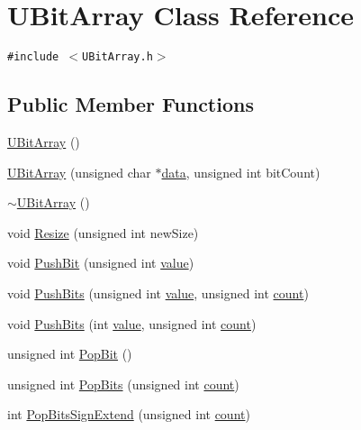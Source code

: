\hypertarget{class_u_bit_array}{
\section{UBitArray Class Reference}
\label{class_u_bit_array}
}
{\tt \#include $<$UBitArray.h$>$}

\subsection*{Public Member Functions}
\begin{CompactItemize}
\item 
\hyperlink{class_u_bit_array_f83313fac0dd451a572604c516e241e0}{UBitArray} ()
\item 
\hyperlink{class_u_bit_array_02dc5ddf7cbc7d723dc93ea490de48bb}{UBitArray} (unsigned char $\ast$\hyperlink{glext__bak_8h_69926c009f2d52c6b6d2c76784af8c64}{data}, unsigned int bitCount)
\item 
\hyperlink{class_u_bit_array_745b48ebd9c9588d615961ffd86ddeed}{$\sim$UBitArray} ()
\item 
void \hyperlink{class_u_bit_array_d6e3884e3d3cc1f8c2882c0e3d181b89}{Resize} (unsigned int newSize)
\item 
void \hyperlink{class_u_bit_array_65be0cc53c2ee958106162939cfd303a}{PushBit} (unsigned int \hyperlink{glext__bak_8h_6a4f8a1a444e9080b297963b3db29fe0}{value})
\item 
void \hyperlink{class_u_bit_array_4f1baeb839a973bacdb02ffffe2bd6a8}{PushBits} (unsigned int \hyperlink{glext__bak_8h_6a4f8a1a444e9080b297963b3db29fe0}{value}, unsigned int \hyperlink{wglext_8h_98d18d6b4e3ba4ed266c6fb54c839d70}{count})
\item 
void \hyperlink{class_u_bit_array_7a8e2cda64a7b0813a78520e3d4e7174}{PushBits} (int \hyperlink{glext__bak_8h_6a4f8a1a444e9080b297963b3db29fe0}{value}, unsigned int \hyperlink{wglext_8h_98d18d6b4e3ba4ed266c6fb54c839d70}{count})
\item 
unsigned int \hyperlink{class_u_bit_array_6329080b1012d67e42fa707ad2d3473f}{PopBit} ()
\item 
unsigned int \hyperlink{class_u_bit_array_cce4aede040372fb8c2db3e60d09b4f7}{PopBits} (unsigned int \hyperlink{wglext_8h_98d18d6b4e3ba4ed266c6fb54c839d70}{count})
\item 
int \hyperlink{class_u_bit_array_03fdd22136b0cb1db321c9ded22d6d04}{PopBitsSignExtend} (unsigned int \hyperlink{wglext_8h_98d18d6b4e3ba4ed266c6fb54c839d70}{count})
\item 

\end{CompactItemize}

